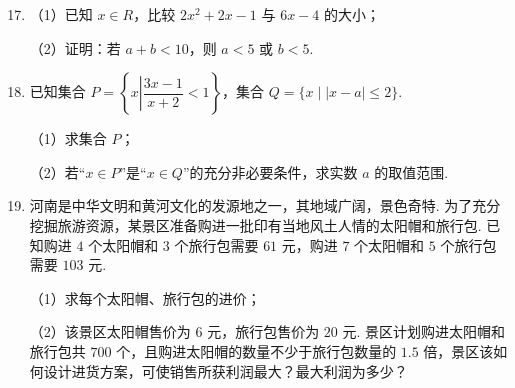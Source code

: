 \documentclass[a4paper,11pt]{article}
\begin{document}

\begin{enumerate}
\setcounter{enumi}{16}

\item （1）已知 $x\in R$，比较 $2x^2+2x-1$ 与 $6x-4$ 的大小；

（2）证明：若 $a+b<10$，则 $a<5$ 或 $b<5$.

\ifanswer
\solbegin
{}
\solend
\fi

\ansspace[6]

\item 已知集合 $P=\left\{x\left|\dfrac{3x-1}{x+2}<1\right.\right\}$，集合 $Q=\{x\mid|x-a|\leqslant2\}$.

（1）求集合 $P$；

（2）若“$x\in P$”是“$x\in Q$”的充分非必要条件，求实数 $a$ 的取值范围.

\ifanswer
\solbegin
{}
\solend
\fi

\ansspace[6]

\item 河南是中华文明和黄河文化的发源地之一，其地域广阔，景色奇特. 为了充分挖掘旅游资源，某景区准备购进一批印有当地风土人情的太阳帽和旅行包. 已知购进 $4$ 个太阳帽和 $3$ 个旅行包需要 $61$ 元，购进 $7$ 个太阳帽和 $5$ 个旅行包需要 $103$ 元.

（1）求每个太阳帽、旅行包的进价；

（2）该景区太阳帽售价为 $6$ 元，旅行包售价为 $20$ 元. 景区计划购进太阳帽和旅行包共 $700$ 个，且购进太阳帽的数量不少于旅行包数量的 $1.5$ 倍，景区该如何设计进货方案，可使销售所获利润最大？最大利润为多少？


\end{enumerate}
\end{document}
